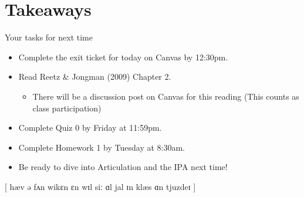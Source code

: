 \documentclass[professionalfonts]{beamer}
\begin{document}
\section*{Takeaways}
\begin{frame}{Your tasks for next time}
    \begin{itemize}
        \item Complete the exit ticket for today on Canvas by 12:30pm.
        \item Read Reetz \& Jongman (2009) Chapter 2.
        \begin{itemize}
            \item There will be a discussion post on Canvas for this reading (This counts as class participation)
        \end{itemize}
        \item Complete Quiz 0 by Friday at 11:59pm.
        \item Complete Homework 1 by Tuesday at 8:30am.
        \item Be ready to dive into Articulation and the IPA next time!
    \end{itemize}
\end{frame}

\begin{frame}
    \begin{center}
        [ hæv ə fʌn wikɛn ɛn wɪl siː ɑl jal ɪn klæs ɑn tjuzdeɪ ]
    \end{center}
\end{frame}

\end{document}
